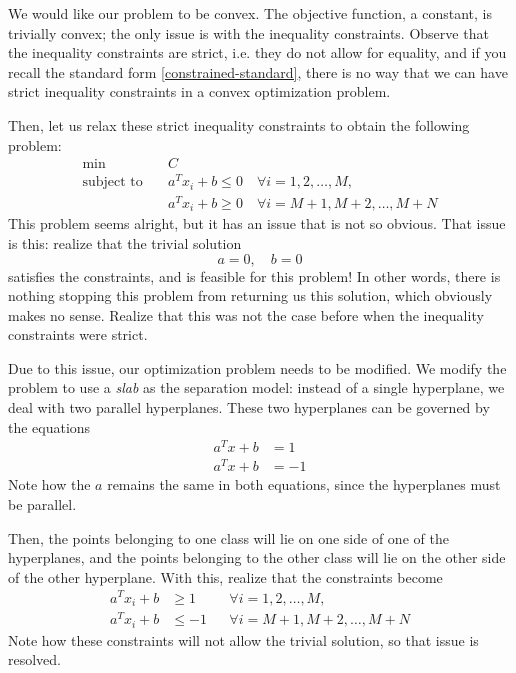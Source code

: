 \documentclass[a4paper]{article}
\theoremstyle{definition}
\begin{document}
We would like our problem to be convex.
The objective function, a constant, is trivially convex; the only issue is with the inequality constraints.
Observe that the inequality constraints are strict, i.e. they do not allow for equality, and if you recall the standard form \eqref{constrained-standard}, there is no way that we can have strict inequality constraints in a convex optimization problem.

Then, let us relax these strict inequality constraints to obtain the following problem:
\begin{align*}
	\min \quad & C \\
	\text{subject to} \quad & a^T x_i + b \leq 0 \quad \forall i = 1, 2, \dots, M, \\
	& a^T x_i + b \geq 0 \quad \forall i = M{+}1, M{+}2, \dots, M{+}N
\end{align*}
This problem seems alright, but it has an issue that is not so obvious.
That issue is this: realize that the trivial solution
\begin{equation*}
	a = 0, \quad b = 0
\end{equation*}
satisfies the constraints, and is feasible for this problem!
In other words, there is nothing stopping this problem from returning us this solution, which obviously makes no sense.
Realize that this was not the case before when the inequality constraints were strict.

Due to this issue, our optimization problem needs to be modified.
We modify the problem to use a \textit{slab} as the separation model: instead of a single hyperplane, we deal with two parallel hyperplanes.
These two hyperplanes can be governed by the equations
\begin{align*}
	a^T x + b & = 1 \\
	a^T x + b & = -1
\end{align*}
Note how the $a$ remains the same in both equations, since the hyperplanes must be parallel.

Then, the points belonging to one class will lie on one side of one of the hyperplanes, and the points belonging to the other class will lie on the other side of the other hyperplane.
With this, realize that the constraints become
\begin{align*}
	a^T x_i + b & \geq 1 && \forall i = 1, 2, \dots, M, \\
	a^T x_i + b & \leq -1 && \forall i = M{+}1, M{+}2, \dots, M{+}N
\end{align*}
Note how these constraints will not allow the trivial solution, so that issue is resolved.
\end{document}
